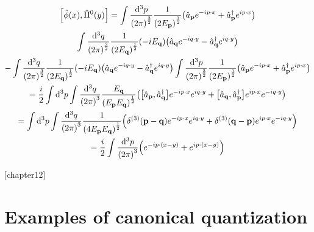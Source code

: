 \documentclass{report}
\theoremstyle{definition}
\begin{document}
\begin{chapter11}
	\begin{gather*}
		\bqty{\hat{\phi}(x),\hat{\Pi}^0(y)} = \int \frac{\dd^3{p}}{\pqty{2\pi}^{\frac{3}{2}}}\frac{1}{\pqty{2E_{\bf p}}^{\frac{1}{2}}}\pqty{\hat{a}_{\bf p}e^{-ip\cdot x} + \hat{a}^{\dagger}_{\bf p}e^{ip\cdot x}} \\
		\int \frac{\dd^3{q}}{\pqty{2\pi}^{\frac{3}{2}}}\frac{1}{\pqty{2E_{\bf q}}^{\frac{1}{2}}}\pqty{-iE_{\bf q}}\pqty{\hat{a}_{\bf q}e^{-iq\cdot y} - \hat{a}^{\dagger}_{\bf q}e^{iq\cdot y}} \\
		-\int \frac{\dd^3{q}}{\pqty{2\pi}^{\frac{3}{2}}}\frac{1}{\pqty{2E_{\bf q}}^{\frac{1}{2}}}\pqty{-iE_{\bf q}}\pqty{\hat{a}_{\bf q}e^{-iq\cdot y} - \hat{a}^{\dagger}_{\bf q}e^{iq\cdot y}}\int \frac{\dd^3{p}}{\pqty{2\pi}^{\frac{3}{2}}}\frac{1}{\pqty{2E_{\bf p}}^{\frac{1}{2}}}\pqty{\hat{a}_{\bf p}e^{-ip\cdot x} + \hat{a}^{\dagger}_{\bf p}e^{ip\cdot x}} \\
		= \frac{i}{2}\int \dd^3{p}\int \frac{\dd^3{q}}{\pqty{2\pi}^3}\frac{E_{\bf q}}{\pqty{E_{\bf p}E_{\bf q}}^{\frac{1}{2}}}\pqty{\bqty{\hat{a}_{\bf p},\hat{a}^{\dagger}_{\bf q}}e^{-ip\cdot x}e^{iq\cdot y} + \bqty{\hat{a}_{\bf q},\hat{a}^{\dagger}_{\bf p}}e^{ip\cdot x}e^{-iq\cdot y}} \\
		= \int \dd^3{p}\int \frac{\dd^3{q}}{\pqty{2\pi}^3}\frac{1}{\pqty{4E_{\bf p}E_{\bf q}}^{\frac{1}{2}}}\pqty{\delta^{(3)}\pqty{\bf p - q}e^{-ip\cdot x}e^{iq\cdot y} + \delta^{(3)}\pqty{\bf q - p}e^{ip\cdot x}e^{-iq\cdot y}} \\
		= \frac{i}{2}\int\frac{\dd^3{p}}{\pqty{2\pi}^3}\pqty{e^{-ip\cdot(x-y)} + e^{ip\cdot(x-y)}}
	\end{gather*}
\end{chapter11}


\newtheorem{chapter12}{Problem}
[chapter12]
\chapter{Examples of canonical quantization}
\end{document}
